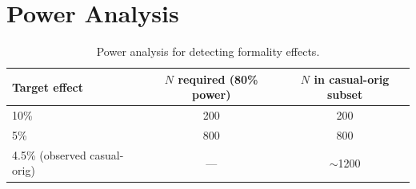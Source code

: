 \documentclass[11pt,a4paper]{article}
\begin{document}
\section{Power Analysis}

\begin{table}[h]
\centering
\small
\caption{Power analysis for detecting formality effects.}
\label{tab:power}
\begin{tabular}{lcc}
\toprule
\textbf{Target effect} & \textbf{$N$ required (80\% power)} & \textbf{$N$ in casual-orig subset} \\
\midrule
10\% & 200 & 200 \\
5\% & 800 & 800 \\
4.5\% (observed casual-orig) & --- & $\sim$1200 \\
\bottomrule
\end{tabular}
\end{table}
\end{document}
